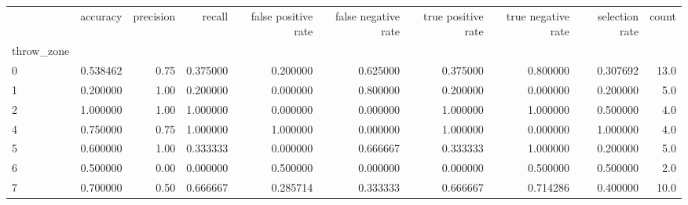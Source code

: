 \begin{tabular}{lrrrrrrrrr}
\toprule
{} &  accuracy &  precision &    recall &  false positive rate &  false negative rate &  true positive rate &  true negative rate &  selection rate &  count \\
throw\_zone &           &            &           &                      &                      &                     &                     &                 &        \\
\midrule
0          &  0.538462 &       0.75 &  0.375000 &             0.200000 &             0.625000 &            0.375000 &            0.800000 &        0.307692 &   13.0 \\
1          &  0.200000 &       1.00 &  0.200000 &             0.000000 &             0.800000 &            0.200000 &            0.000000 &        0.200000 &    5.0 \\
2          &  1.000000 &       1.00 &  1.000000 &             0.000000 &             0.000000 &            1.000000 &            1.000000 &        0.500000 &    4.0 \\
4          &  0.750000 &       0.75 &  1.000000 &             1.000000 &             0.000000 &            1.000000 &            0.000000 &        1.000000 &    4.0 \\
5          &  0.600000 &       1.00 &  0.333333 &             0.000000 &             0.666667 &            0.333333 &            1.000000 &        0.200000 &    5.0 \\
6          &  0.500000 &       0.00 &  0.000000 &             0.500000 &             0.000000 &            0.000000 &            0.500000 &        0.500000 &    2.0 \\
7          &  0.700000 &       0.50 &  0.666667 &             0.285714 &             0.333333 &            0.666667 &            0.714286 &        0.400000 &   10.0 \\
\bottomrule
\end{tabular}
